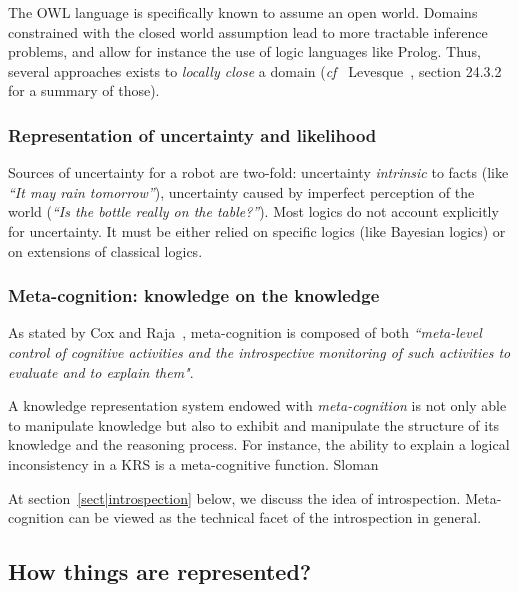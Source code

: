 \documentclass[a4paper, twocolumn]{article}
\newcommand{\cf}{{\textit{cf~}}}
\begin{document}
The OWL language is specifically known to assume an open world.  Domains
constrained with the closed world assumption lead to more tractable inference
problems, and allow for instance the use of logic languages like Prolog. Thus,
several approaches exists to \emph{locally close} a domain (\cf
Levesque~\cite{Levesque2008}, section 24.3.2 for a summary of those).

\subsubsection{Representation of uncertainty and likelihood}

Sources of uncertainty for a robot are two-fold: uncertainty \emph{intrinsic}
to facts (like \emph{``It may rain tomorrow''}), uncertainty caused by
imperfect perception of the world (\emph{``Is the bottle really on the
table?''}). Most logics do not account explicitly for uncertainty. It must be
either relied on specific logics (like Bayesian logics) or on extensions of
classical logics.

\subsubsection{Meta-cognition: knowledge on the knowledge}

As stated by Cox and Raja~\cite{Cox2007}, meta-cognition is composed of both
\emph{``meta-level control of cognitive activities and the introspective
monitoring of such activities to evaluate and to explain them"}.

A knowledge representation system endowed with \emph{meta-cognition} is not
only able to manipulate knowledge but also to exhibit and manipulate the
structure of its knowledge and the reasoning process. For instance, the ability
to explain a logical inconsistency in a KRS is a meta-cognitive function.
Sloman~\cite{Sloman2011} 

At section~\ref{sect|introspection} below, we discuss the idea of
introspection.  Meta-cognition can be viewed as the technical facet of the
introspection in general.


\subsection{How things are represented?}
\label{sect|higher-level-domain-representation}

\begin{scriptsize}
\begin{center}
\end{center}
\end{scriptsize}
\end{document}
